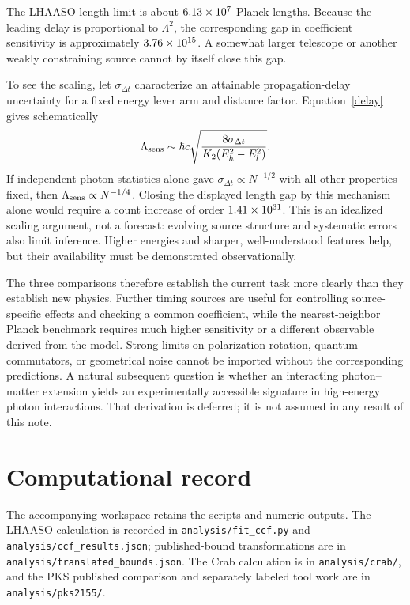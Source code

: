 \documentclass[11pt]{article}
\begin{document}
The LHAASO length limit is about $6.13\times10^{7}$ Planck lengths. Because the leading delay is proportional to $\Lambda^2$, the corresponding gap in coefficient sensitivity is approximately $3.76\times10^{15}$. A somewhat larger telescope or another weakly constraining source cannot by itself close this gap.

To see the scaling, let $\sigma_{\Delta t}$ characterize an attainable propagation-delay uncertainty for a fixed energy lever arm and distance factor. Equation~\eqref{delay} gives schematically
\begin{equation}
 \Lambda_{\rm sens}\sim\hbar c\sqrt{
 \frac{8\sigma_{\Delta t}}{K_2(E_h^2-E_l^2)}}.
\end{equation}
If independent photon statistics alone gave $\sigma_{\Delta t}\propto N^{-1/2}$ with all other properties fixed, then $\Lambda_{\rm sens}\propto N^{-1/4}$. Closing the displayed length gap by this mechanism alone would require a count increase of order $1.41\times10^{31}$. This is an idealized scaling argument, not a forecast: evolving source structure and systematic errors also limit inference. Higher energies and sharper, well-understood features help, but their availability must be demonstrated observationally.

The three comparisons therefore establish the current task more clearly than they establish new physics. Further timing sources are useful for controlling source-specific effects and checking a common coefficient, while the nearest-neighbor Planck benchmark requires much higher sensitivity or a different observable derived from the model. Strong limits on polarization rotation, quantum commutators, or geometrical noise cannot be imported without the corresponding predictions. A natural subsequent question is whether an interacting photon--matter extension yields an experimentally accessible signature in high-energy photon interactions. That derivation is deferred; it is not assumed in any result of this note.

\newpage
\appendix
\section{Computational record}
The accompanying workspace retains the scripts and numeric outputs. The LHAASO calculation is recorded in \texttt{analysis/fit\_ccf.py} and \texttt{analysis/ccf\_results.json}; published-bound transformations are in \texttt{analysis/translated\_bounds.json}. The Crab calculation is in \texttt{analysis/crab/}, and the PKS published comparison and separately labeled tool work are in \texttt{analysis/pks2155/}.
\end{document}
